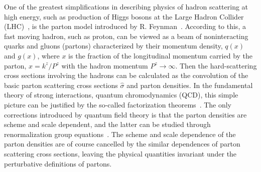 One of the greatest simplifications in describing physics of hadron scattering
at high energy, such as production of Higgs bosons at the Large Hadron Collider (LHC)~\cite{science},
is the parton model introduced by R. Feynman~\cite{Feynman:1969ej}. According to this, a fast moving hadron, such as proton, can be viewed
as a beam of noninteracting quarks and gluons (partons) characterized by their momentum density,
$q(x)$ and $g(x)$, where $x$ is the fraction of the longitudinal momentum carried by the parton, $x= k^z/P^z$ with
the hadron momentum $P^z \rightarrow \infty$. Then the hard-scattering cross sections involving the hadrons can be
calculated as the convolution of the basic parton scattering cross sections $\hat \sigma$ and parton densities.
In the fundamental theory of strong interactions, quantum chromodynamics (QCD), this simple picture can
be justified by the so-called factorization theorems~\cite{Mueller:1989hs,Sterman:1994ce,Collins:2011zzd}. The only corrections
introduced by quantum field theory
is that the parton densities are scheme and scale dependent, and the latter can be studied through renormalization
group equations~\cite{Altarelli:1977zs}. The scheme and scale dependence
of the parton densities are of course cancelled by the similar dependences of parton scattering cross sections,
leaving the physical quantities invariant under the perturbative definitions
of partons.

